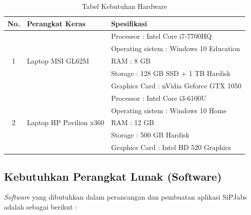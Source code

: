 \begin{table}[H]
	\centering
	\caption{Tabel Kebutuhan Hardware}
	\begin{tabular}{ | c | l | l | }
		\hline
		No. & Perangkat Keras & Spesifikasi \\
		\hline
		\multirow{5}{*}{1} & \multirow{5}{*}{Laptop MSI GL62M} & Processor : Intel Core i7-7700HQ \\
		& & Operating sistem : Windows 10 Education \\
		& & RAM : 8 GB \\
		& & Storage : 128 GB SSD + 1 TB Hardisk \\
		& & Graphics Card :  nVidia Geforce GTX 1050 \\
		
		
		\hline
		
		\multirow{5}{*}{2} & \multirow{5}{*}{Laptop HP Pavilion x360} & Processor : Intel Core i3-6100U \\
		& & Operating sistem : Windows 10 Home \\
		& & RAM : 12 GB \\
		& & Storage : 500 GB Hardisk\\
		& & Graphics Card : Intel HD 520 Graphics \\
		\hline
	\end{tabular}
\end{table}



\subsection{Kebutuhkan Perangkat Lunak (Software)}

\textit{Software} yang dibutuhkan dalam perancangan dan pembuatan aplikasi SiPJabs
adalah sebagai berikut :

